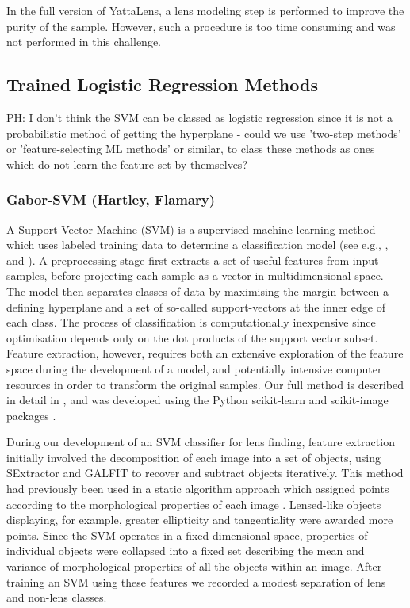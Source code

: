 \documentclass[useAMS,usenatbib]{mnras}
\newcommand{\red}[1]{{\color{red} #1}}
\begin{document}
In the full version of YattaLens, a lens modeling step is performed to improve the purity of the sample. However, such a procedure is too time consuming and was not performed in this challenge.

\subsection{Trained Logistic Regression Methods }
\red{PH: I don't think the SVM can be classed as logistic regression since it is not a probabilistic method of getting the hyperplane - could we use 'two-step methods' or 'feature-selecting ML methods' or similar, to class these methods as ones which do not learn the feature set by themselves?}

\subsubsection{Gabor-SVM (Hartley, Flamary)}

A Support Vector Machine (SVM) is a supervised machine learning method which uses labeled training data to determine a classification model (see e.g., \citet{vapnik79estimation}, \citet{Cortes1995} and \citet{Burges1998}). A preprocessing stage first extracts a set of useful features from input samples, before projecting each sample as a vector in multidimensional space. The model then separates classes of data by maximising the margin between a defining hyperplane and a set of so-called support-vectors at the inner edge of each class. The process of classification is computationally inexpensive since optimisation depends only on the dot products of the support vector subset. Feature extraction, however,  requires both an extensive exploration of the feature space during the development of a model, and potentially intensive computer resources in order to transform the original samples. Our full method is described in detail in \citet{hartley2017support}, and was developed using the Python scikit-learn and scikit-image packages \citep{scikit-learn,scikit-image}.

During our development of an SVM classifier for lens finding, feature extraction initially involved the decomposition of each image into a set of objects, using SExtractor \citep{1996A&AS..117..393B} and GALFIT \citep{2002AJ....124..266P} to recover and subtract objects iteratively. This method had previously been used in a static algorithm approach which assigned points according to the morphological properties of each image \citep[see][]{2014A&A...566A..63J}. Lensed-like objects displaying, for example, greater ellipticity and tangentiality were awarded more points. Since the SVM operates in a fixed dimensional space,  properties of individual objects were collapsed into a fixed set describing the mean and variance of morphological properties of all the objects within an image. After training an SVM using these features we recorded a modest separation of lens and non-lens classes.
\end{document}
